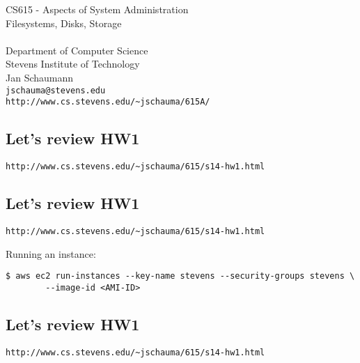 \documentclass[xga]{xdvislides}
\begin{document}
\setfontphv

\lhead{\slidetitle}				%
\cfoot{\relax}					%
\rfoot{\Gray{\today}}

\vspace*{\fill}
\begin{center}
	\Hugesize
		CS615 - Aspects of System Administration\\ [1em]
		Filesystems, Disks, Storage\\ [1em]
	\hspace*{5mm}\blueline\\ [1em]
	\Normalsize
		Department of Computer Science\\
		Stevens Institute of Technology\\
		Jan Schaumann\\
		\verb+jschauma@stevens.edu+ \\
		\verb+http://www.cs.stevens.edu/~jschauma/615A/+
\end{center}
\vspace*{\fill}

\subsection{Let's review HW1}
{\tt http://www.cs.stevens.edu/\~{}jschauma/615/s14-hw1.html} \\
\vspace{.5in}

\subsection{Let's review HW1}
{\tt http://www.cs.stevens.edu/\~{}jschauma/615/s14-hw1.html} \\
\vspace{.5in}

Running an instance:
\begin{verbatim}
$ aws ec2 run-instances --key-name stevens --security-groups stevens \
        --image-id <AMI-ID>
\end{verbatim}

\subsection{Let's review HW1}
{\tt http://www.cs.stevens.edu/\~{}jschauma/615/s14-hw1.html} \\
\vspace{.5in}
\end{document}
